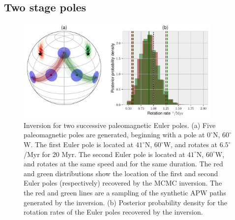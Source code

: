 \documentclass[preprint,12pt,authoryear]{elsarticle}
\begin{document}
\subsection{Two stage poles}
\begin{figure}
\includegraphics[width=0.9\textwidth]{figures/synthetic/two_euler_poles.pdf}
\caption[Inversion for two successive paleomagnetic Euler poles.]{Inversion for two successive paleomagnetic Euler poles. (a) Five paleomagnetic poles are generated, beginning with a pole at $0^\circ$N, $60^\circ$W. The first Euler pole is located at $41^\circ$N, $60^\circ$W, and rotates at $6.5^\circ$/Myr for 20 Myr. The second Euler pole is located at $41^\circ$N, $60^\circ$W, and rotates at the same speed and for the same duration. The red and green distributions show the location of the first and second Euler poles (respectively) recovered by the MCMC inversion. The the red and green lines are a sampling of the synthetic APW paths generated by the inversion. (b) Posterior probability density for the rotation rates of the Euler poles recovered by the inversion.}
\label{fig:two_euler_poles}
\end{figure}
\end{document}
